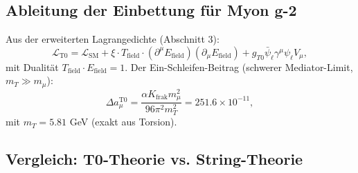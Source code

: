 \documentclass[12pt,a4paper]{article}
\begin{document}
	\subsection{Ableitung der Einbettung für Myon g-2}
	
	Aus der erweiterten Lagrangedichte (Abschnitt 3):
	\begin{equation}
		\mathcal{L}_{\text{T0}} = \mathcal{L}_{\text{SM}} + \xi \cdot T_{\text{field}} \cdot (\partial^\mu E_{\text{field}})(\partial_\mu E_{\text{field}}) + g_{T0} \bar{\psi}_\ell \gamma^\mu \psi_\ell V_\mu,
	\end{equation}
	mit Dualität $T_{\text{field}} \cdot E_{\text{field}} = 1$. Der Ein-Schleifen-Beitrag (schwerer Mediator-Limit, $m_T \gg m_\mu$):
	\begin{equation}
		\Delta a_\mu^{\text{T0}} = \frac{\alpha K_{\text{frak}} m_\mu^2}{96 \pi^2 m_T^2} = 251.6 \times 10^{-11},
	\end{equation}
	mit $m_T = 5.81$ GeV (exakt aus Torsion).
	
	\subsection{Vergleich: T0-Theorie vs. String-Theorie}
	
\end{document}
